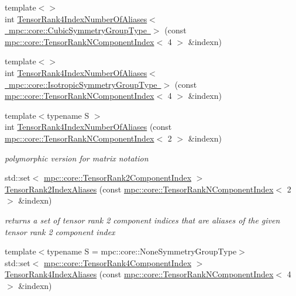 \begin{DoxyCompactItemize}
\item 
{\footnotesize template$<$$>$ }\\int \mbox{\hyperlink{namespacempc_1_1core_a3dda133f6b673b26c72f42e5f08e65e6}{Tensor\+Rank4\+Index\+Number\+Of\+Aliases$<$ mpc\+::core\+::\+Cubic\+Symmetry\+Group\+Type $>$}} (const \mbox{\hyperlink{classmpc_1_1core_1_1_tensor_rank_n_component_index}{mpc\+::core\+::\+Tensor\+Rank\+N\+Component\+Index}}$<$ 4 $>$ \&indexn)
\item 
{\footnotesize template$<$$>$ }\\int \mbox{\hyperlink{namespacempc_1_1core_a08ef4837296a243c256799affc08ecca}{Tensor\+Rank4\+Index\+Number\+Of\+Aliases$<$ mpc\+::core\+::\+Isotropic\+Symmetry\+Group\+Type $>$}} (const \mbox{\hyperlink{classmpc_1_1core_1_1_tensor_rank_n_component_index}{mpc\+::core\+::\+Tensor\+Rank\+N\+Component\+Index}}$<$ 4 $>$ \&indexn)
\item 
{\footnotesize template$<$typename S $>$ }\\int \mbox{\hyperlink{namespacempc_1_1core_a037ed4a13ba13f31c94daeb8854c473b}{Tensor\+Rank4\+Index\+Number\+Of\+Aliases}} (const \mbox{\hyperlink{classmpc_1_1core_1_1_tensor_rank_n_component_index}{mpc\+::core\+::\+Tensor\+Rank\+N\+Component\+Index}}$<$ 2 $>$ \&indexn)
\begin{DoxyCompactList}\small\item\em polymorphic version for matrix notation \end{DoxyCompactList}\item 
std\+::set$<$ \mbox{\hyperlink{namespacempc_1_1core_a7ae080dac58868c1e167479dce34928a}{mpc\+::core\+::\+Tensor\+Rank2\+Component\+Index}} $>$ \mbox{\hyperlink{namespacempc_1_1core_ac57e02dffa1feb89711fd3abab43faff}{Tensor\+Rank2\+Index\+Aliases}} (const \mbox{\hyperlink{classmpc_1_1core_1_1_tensor_rank_n_component_index}{mpc\+::core\+::\+Tensor\+Rank\+N\+Component\+Index}}$<$ 2 $>$ \&indexn)
\begin{DoxyCompactList}\small\item\em returns a set of tensor rank 2 component indices that are aliases of the given tensor rank 2 component index \end{DoxyCompactList}\item 
{\footnotesize template$<$typename S  = mpc\+::core\+::\+None\+Symmetry\+Group\+Type$>$ }\\std\+::set$<$ \mbox{\hyperlink{namespacempc_1_1core_a54c081f41b2475abd10182bf023805d2}{mpc\+::core\+::\+Tensor\+Rank4\+Component\+Index}} $>$ \mbox{\hyperlink{namespacempc_1_1core_a40d1fb8009b3f7c34a6ea01a4b46027f}{Tensor\+Rank4\+Index\+Aliases}} (const \mbox{\hyperlink{classmpc_1_1core_1_1_tensor_rank_n_component_index}{mpc\+::core\+::\+Tensor\+Rank\+N\+Component\+Index}}$<$ 4 $>$ \&indexn)

\end{DoxyCompactItemize}
